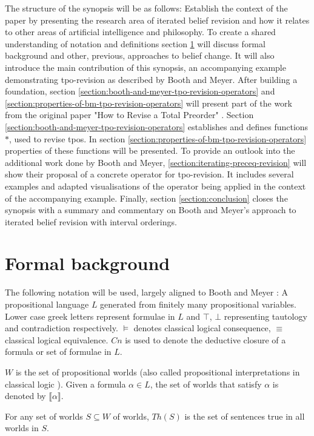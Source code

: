 \documentclass[english, 12pt]{scrartcl}
\theoremstyle{definition}
\theoremstyle{definition}
\theoremstyle{definition}
\newcommand{\modelsOf}[1]{\llbracket #1 \rrbracket}
\begin{document}
The structure of the synopsis will be as follows: Establish the context of the paper by presenting the research area of iterated belief revision and how it relates to other areas of artificial intelligence and philosophy. To create a shared understanding of notation and definitions section \ref{section:formal-background} will discuss formal background and other, previous, approaches to belief change. It will also introduce the main contribution of this synopsis, an accompanying example demonstrating tpo-revision as described by Booth and Meyer. After building a foundation, section \ref{section:booth-and-meyer-tpo-revision-operators} and \ref{section:properties-of-bm-tpo-revision-operators} will present part of the work from the original paper "How to Revise a Total Preorder" \cite{Booth2011}. Section \ref{section:booth-and-meyer-tpo-revision-operators} establishes and defines functions $\ast$, used to revise tpos. In section \ref{section:properties-of-bm-tpo-revision-operators} properties of these functions will be presented. To provide an outlook into the additional work done by Booth and Meyer, \ref{section:iterating-preceq-revision} will show their proposal of a concrete operator for tpo-revision. It includes several examples and adapted visualisations of the operator being applied in the context of the accompanying example. Finally, section \ref{section:conclusion} closes the synopsis with a summary and commentary on Booth and Meyer's approach to iterated belief revision with interval orderings.

\section{Formal background}
\label{section:formal-background}
The following notation will be used, largely aligned to Booth and Meyer \cite{Booth2011}: A propositional language $L$ generated from finitely many propositional variables. Lower case greek letters represent formulae in $L$ and $\top$, $\bot$ representing tautology and contradiction respectively. $\models$ denotes classical logical consequence, $\equiv$ classical logical equivalence. $Cn$ is used to denote the deductive closure of a formula or set of formulae in $L$.

$W$ is the set of propositional worlds (also called propositional interpretations in classical logic \cite{Kai2020}). Given a formula $\alpha \in L$, the set of worlds that satisfy $\alpha$ is denoted by $\modelsOf{\alpha}$.

For any set of worlds $S \subseteq W$ of worlds, $Th(S)$ is the set of sentences true in all worlds in $S$.
\end{document}
